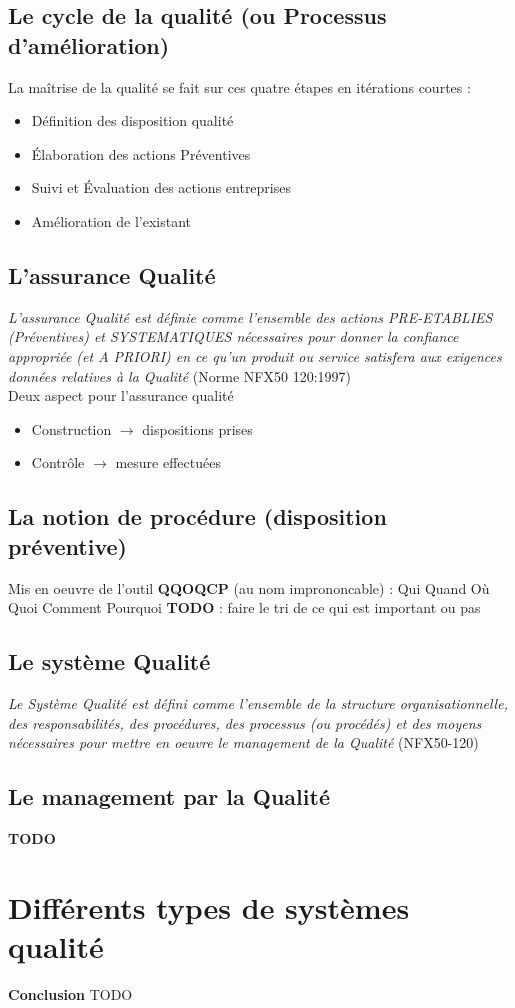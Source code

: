 	\subsection{Le cycle de la qualité (ou Processus d'amélioration)}
La maîtrise de la qualité se fait sur ces quatre étapes en itérations courtes : 
	\begin{itemize}
	\item Définition des disposition qualité
	\item Élaboration des actions Préventives
	\item Suivi et Évaluation des actions entreprises
	\item Amélioration de l’existant
	\end{itemize}

	\subsection{L'assurance Qualité}
\textit{L'assurance Qualité est définie comme l'ensemble des actions PRE-ETABLIES (Préventives) et SYSTEMATIQUES nécessaires pour donner la confiance appropriée (et A PRIORI) en ce qu'un produit ou service satisfera aux exigences données relatives à la Qualité} (Norme NFX50 120:1997)\\
Deux aspect pour l’assurance qualité
\begin{itemize}
\item Construction $\rightarrow$ dispositions prises
\item Contrôle $\rightarrow$ mesure effectuées
\end{itemize}



	\subsection{La notion de procédure (disposition préventive)}
Mis en oeuvre de l’outil \textbf{QQOQCP} (au nom imprononcable) : Qui Quand Où Quoi Comment Pourquoi
\textbf{TODO} : faire le tri de ce qui est important ou pas

	\subsection{Le système Qualité}
\textit{Le Système Qualité est défini comme l'ensemble de la structure organisationnelle,
des responsabilités, des procédures, des processus (ou procédés) et des moyens
nécessaires pour mettre en oeuvre le management de la Qualité }(NFX50-120)


	\subsection{Le management par la Qualité}
\textbf{TODO}

\section{Différents types de systèmes qualité}

\textbf{Conclusion}
TODO %
